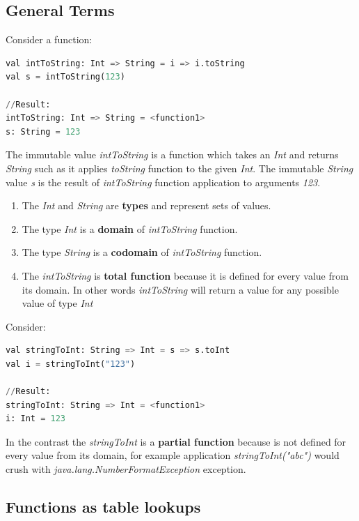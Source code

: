 \documentclass[12pt,twoside,a4paper]{report}
\begin{document}
\subsection{General Terms}\label{6.4.2}

Consider a function:
\begin{lstlisting}[language=python]
val intToString: Int => String = i => i.toString
val s = intToString(123)

//Result:
intToString: Int => String = <function1>
s: String = 123
\end{lstlisting}
The immutable value \emph{intToString} is a function which takes an \emph{Int} and returns \emph{String} such as it applies \emph{toString} function to the given \emph{Int}. The immutable \emph{String} value \emph{s} is the result of \emph{intToString} function application to arguments \emph{123}.

\begin{enumerate}\itemsep1pt \parskip0pt 
\item The \emph{Int} and \emph{String} are \textbf{types} and represent sets of values.
\item The type \emph{Int} is a \textbf{domain} of \emph{intToString} function.
\item The type \emph{String} is a \textbf{codomain} of \emph{intToString} function.
\item The \emph{intToString} is \textbf{total function} because it is defined for every value from its domain. In other words \emph{intToString} will return a value for any possible value of type \emph{Int}
\end{enumerate}

Consider:
\begin{lstlisting}[language=python]
val stringToInt: String => Int = s => s.toInt
val i = stringToInt("123")

//Result:
stringToInt: String => Int = <function1>
i: Int = 123
\end{lstlisting}

In the contrast the \emph{stringToInt} is a \textbf{partial function} because is not defined for every value from its domain, for example application \emph{stringToInt("abc")} would crush with \emph{java.lang.NumberFormatException} exception.

\subsection{Functions as table lookups}\label{6.4.3}
\end{document}
